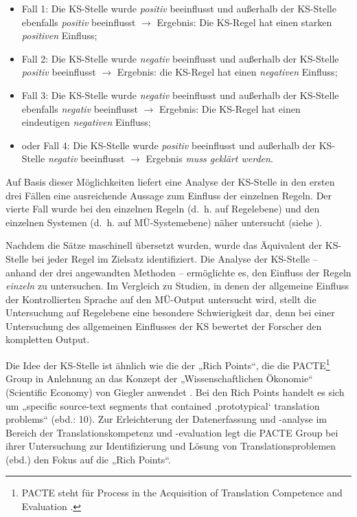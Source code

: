 \begin{itemize}
\item Fall 1: Die KS-Stelle wurde \textit{positiv} beeinflusst und außerhalb der KS-Stelle ebenfalls \textit{positiv} beeinflusst $\to$ Ergebnis: Die KS-Regel hat einen starken \textit{positiven} Einfluss;
\item Fall 2: Die KS-Stelle wurde \textit{negativ} beeinflusst und außerhalb der KS-Stelle \textit{positiv} beeinflusst $\to$ Ergebnis: die KS-Regel hat einen \textit{negativen} Einfluss;
\item Fall 3: Die KS-Stelle wurde \textit{negativ} beeinflusst und außerhalb der KS-Stelle ebenfalls \textit{negativ} beeinflusst $\to$ Ergebnis: Die KS-Regel hat einen eindeutigen \textit{negativen} Einfluss;
\item oder Fall 4: Die KS-Stelle wurde \textit{positiv} beeinflusst und außerhalb der KS-Stelle \textit{negativ} beeinflusst $\to$ Ergebnis \textit{muss geklärt werden}.
\end{itemize}

Auf Basis dieser Möglichkeiten liefert eine Analyse der KS-Stelle in den ersten drei Fällen eine ausreichende Aussage zum Einfluss der einzelnen Regeln. Der vierte Fall wurde bei den einzelnen Regeln (d.~h. auf Regelebene) und den einzelnen Systemen (d.~h. auf MÜ-Systemebene) näher untersucht (siehe ).

Nachdem die Sätze maschinell übersetzt wurden, wurde das Äquivalent der KS-Stelle bei jeder Regel im Zielsatz identifiziert. Die Analyse der KS-Stelle -- anhand der drei angewandten Methoden -- ermöglichte es, den Einfluss der Regeln \textit{einzeln} zu untersuchen. Im Vergleich zu Studien, in denen der allgemeine Einfluss der Kontrollierten Sprache auf den MÜ-Output untersucht wird, stellt die Untersuchung auf Regelebene eine besondere Schwierigkeit dar, denn bei einer Untersuchung des allgemeinen Einflusses der KS bewertet der Forscher den kompletten Output.

Die Idee der KS-Stelle ist ähnlich wie die der „Rich Points“, die die PACTE\footnote{{{{PACTE steht für Process in the Acquisition of Translation Competence and Evaluation \citep{PACTE2011}.}}}} Group in Anlehnung an das Konzept der „Wissenschaftlichen Ökonomie“ (Scientific Economy) von Giegler anwendet \citep{PACTE2011}. Bei den Rich Points handelt es sich um „specific source-text segments that contained ‚prototypical‘ translation problems“ (ebd.: 10). Zur Erleichterung der Datenerfassung und -analyse im Bereich der Translationskompetenz und -evaluation legt die PACTE Group bei ihrer Untersuchung zur Identifizierung und Lösung von Translationsproblemen (ebd.) den Fokus auf die „Rich Points“.

